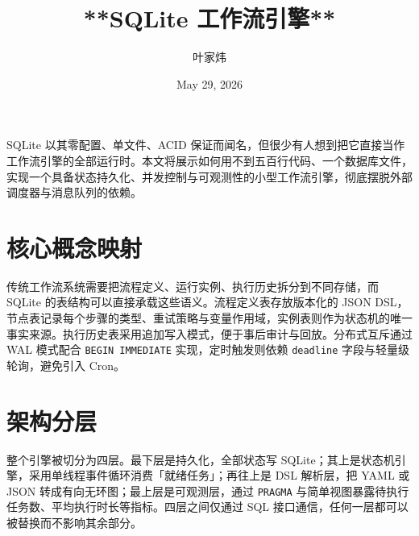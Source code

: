 \title{**SQLite 工作流引擎**}
\author{叶家炜}
\date{May 29, 2026}
\maketitle
SQLite 以其零配置、单文件、ACID 保证而闻名，但很少有人想到把它直接当作工作流引擎的全部运行时。本文将展示如何用不到五百行代码、一个数据库文件，实现一个具备状态持久化、并发控制与可观测性的小型工作流引擎，彻底摆脱外部调度器与消息队列的依赖。\par
\chapter{核心概念映射}
传统工作流系统需要把流程定义、运行实例、执行历史拆分到不同存储，而 SQLite 的表结构可以直接承载这些语义。流程定义表存放版本化的 JSON DSL，节点表记录每个步骤的类型、重试策略与变量作用域，实例表则作为状态机的唯一事实来源。执行历史表采用追加写入模式，便于事后审计与回放。分布式互斥通过 WAL 模式配合 \texttt{BEGIN IMMEDIATE} 实现，定时触发则依赖 \texttt{deadline} 字段与轻量级轮询，避免引入 Cron。\par
\chapter{架构分层}
整个引擎被切分为四层。最下层是持久化，全部状态写 SQLite；其上是状态机引擎，采用单线程事件循环消费「就绪任务」；再往上是 DSL 解析层，把 YAML 或 JSON 转成有向无环图；最上层是可观测层，通过 \texttt{PRAGMA} 与简单视图暴露待执行任务数、平均执行时长等指标。四层之间仅通过 SQL 接口通信，任何一层都可以被替换而不影响其余部分。\par

